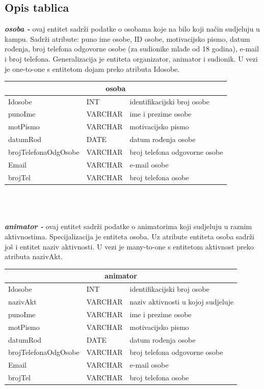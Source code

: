 \subsection {Opis tablica}
\textit {\textbf{osoba -}} ovaj entitet sadrži podatke o osobama koje na bilo koji način sudjeluju u kampu. Sadrži atribute: puno ime osobe, ID osobe, motivacijsko pismo, datum rođenja, broj telefona odgovorne osobe (za sudionike mlađe od 18 godina), e-mail i broj telefona. Generalizacija je entiteta organizator, animator i sudionik. U vezi je one-to-one s entitetom dojam preko atributa Idosobe.
\\
\begin{tabular} {|l|l|l|}
	
	\hline \multicolumn{3}{|c|}{\textbf{osoba}}	 \\ \hline
	
	\cellcolor{aquamarine}Idosobe & INT	&  	identifikacijski broj osobe\\ \hline
	punoIme	& VARCHAR &   ime i prezime osobe	\\ \hline 
	motPismo & VARCHAR &  motivacijsko pismo \\ \hline 
	datumRod & DATE	&  	datum rođenja osobe	\\ \hline 
	brojTelefonaOdgOsobe & 	VARCHAR	&	broj telefona odgovorne osobe \\ \hline
	Email &	VARCHAR	&	e-mail osobe \\ \hline
	brojTel	&	VARCHAR	&	broj telefona osobe \\ \hline
\end{tabular}\\
\\
\\
\textbf{\textit{animator -}} ovaj entitet sadrži podatke o animatorima koji sudjeluju u raznim aktivnostima. Specijalizacija je entiteta osoba. Uz atribute entiteta osoba sadrži još i entitet naziv aktivnosti. U vezi je many-to-one s entitetom aktivnost preko atributa nazivAkt.\\
\begin{tabular}{|l|l|l|}
	
	\hline \multicolumn{3}{|c|}{\textbf{animator}}	\\  \hline
	
	\cellcolor{aquamarine}Idosobe & INT	&  	identifikacijski broj osobe\\ \hline
	\cellcolor{blizzardblue}nazivAkt	& VARCHAR &   naziv aktivnosti u kojoj sudjeluje	\\ \hline 
	punoIme	& VARCHAR &   ime i prezime osobe	\\ \hline 
	motPismo & VARCHAR &  motivacijsko pismo \\ \hline 
	datumRod & DATE	&  	datum rođenja osobe	\\ \hline 
	brojTelefonaOdgOsobe & 	VARCHAR	&	broj telefona odgovorne osobe \\ \hline
	Email &	VARCHAR	&	e-mail osobe \\ \hline
	brojTel	&	VARCHAR	&	broj telefona osobe \\ \hline
\end{tabular} \\ \\
